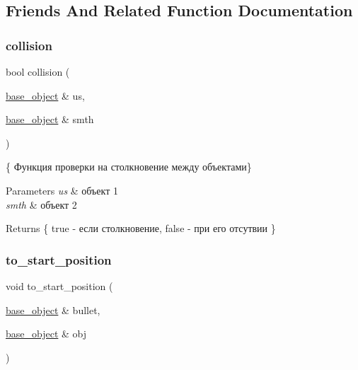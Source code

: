 \subsection{Friends And Related Function Documentation}
\mbox{\label{classbase__object_a38cd5b11f00fd31a9939b0c6e293d593}} 
\subsubsection{\texorpdfstring{collision}{collision}}
{\footnotesize\ttfamily bool collision (\begin{DoxyParamCaption}\item[{\mbox{\hyperlink{classbase__object}{base\+\_\+object}} \&}]{us,  }\item[{\mbox{\hyperlink{classbase__object}{base\+\_\+object}} \&}]{smth }\end{DoxyParamCaption})\hspace{0.3cm}{\ttfamily [friend]}}



\{ Функция проверки на столкновение между объектами\} 


\begin{DoxyParams}{Parameters}
{\em us} & объект 1 \\
\hline
{\em smth} & объект 2\\
\hline
\end{DoxyParams}
\begin{DoxyReturn}{Returns}
\{ true -\/ если столкновение, false -\/ при его отсутвии \} 
\end{DoxyReturn}
\mbox{\label{classbase__object_a712e0cdc0ba13dc26f836adeccdc9264}} 
\subsubsection{\texorpdfstring{to\_start\_position}{to\_start\_position}}
{\footnotesize\ttfamily void to\+\_\+start\+\_\+position (\begin{DoxyParamCaption}\item[{\mbox{\hyperlink{classbase__object}{base\+\_\+object}} \&}]{bullet,  }\item[{\mbox{\hyperlink{classbase__object}{base\+\_\+object}} \&}]{obj }\end{DoxyParamCaption})\hspace{0.3cm}{\ttfamily [friend]}}



